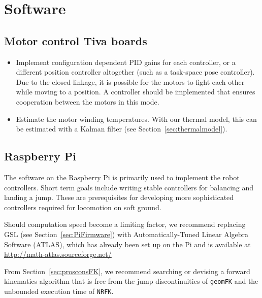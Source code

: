 \documentclass{report}
\begin{document}
\section[Software]{Software}
\subsection[Motor control Tiva boards]{Motor control Tiva boards}
\begin{itemize}
\item Implement configuration dependent PID gains for each controller, or a different position controller altogether (such as a task-space pose controller). Due to the closed linkage, it is possible for the motors to fight each other while moving to a position. A controller should be implemented that ensures cooperation between the motors in this mode.
\item Estimate the motor winding temperatures. With our thermal model, this can be estimated with a Kalman filter (see Section~\ref{sec:thermalmodel}).
\end{itemize}

\subsection[Raspberry Pi]{Raspberry Pi}
The software on the Raspberry Pi is primarily used to implement the robot controllers. Short term goals include writing stable controllers for balancing and landing a jump. These are prerequisites for developing more sophisticated controllers required for locomotion on soft ground.

Should computation speed become a limiting factor, we recommend replacing GSL (see Section~\ref{sec:PiFirmware}) with Automatically-Tuned Linear Algebra Software (ATLAS), which has already been set up on the Pi and is available at \url{http://math-atlas.sourceforge.net/}

From Section~\ref{sec:prosconsFK}, we recommend searching or devising a forward kinematics algorithm that is free from the jump discontinuities of \texttt{geomFK} and the unbounded execution time of \texttt{NRFK}.
\end{document}
